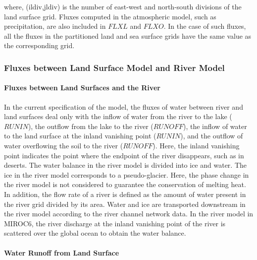 where, (ildiv,jldiv) is the number of east-west and north-south
divisions of the land surface grid. Fluxes computed in the atmospheric
model, such as precipitation, are also included in \(FLXL\) and
\(FLXO\). In the case of such fluxes, all the fluxes in the partitioned
land and sea surface grids have the same value as the corresponding
grid.

\hypertarget{fluxes-between-land-surface-model-and-river-model}{%
\subsubsection{Fluxes between Land Surface Model and River
Model}\label{fluxes-between-land-surface-model-and-river-model}}

\hypertarget{fluxes-between-land-surfaces-and-the-river}{%
\paragraph{Fluxes between Land Surfaces and the
River}\label{fluxes-between-land-surfaces-and-the-river}}

In the current specification of the model, the fluxes of water between
river and land surfaces deal only with the inflow of water from the
river to the lake (\(RUNIN\)), the outflow from the lake to the river
(\(RUNOFF\)), the inflow of water to the land surface at the inland
vanishing point (\(RUNIN\)), and the outflow of water overflowing the
soil to the river (\(RUNOFF\)). Here, the inland vanishing point
indicates the point where the endpoint of the river disappears, such as
in deserts. The water balance in the river model is divided into ice and
water. The ice in the river model corresponds to a pseudo-glacier. Here,
the phase change in the river model is not considered to guarantee the
conservation of melting heat. In addition, the flow rate of a river is
defined as the amount of water present in the river grid divided by its
area. Water and ice are transported downstream in the river model
according to the river channel network data. In the river model in
MIROC6, the river discharge at the inland vanishing point of the river
is scattered over the global ocean to obtain the water balance.

\hypertarget{water-runoff-from-land-surface}{%
\paragraph{Water Runoff from Land
Surface}\label{water-runoff-from-land-surface}}

